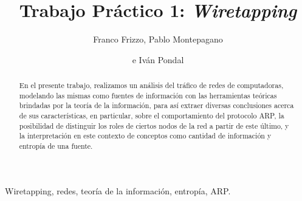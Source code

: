 \documentclass[%
    final,
    notitlepage,
    narroweqnarray,
    inline,
    twoside,
]{ieee}
\begin{document}
\title[Trabajo Práctico 1: Wiretapping]{%
       Trabajo Práctico 1: \emph{Wiretapping}}

\author[FRIZZO, MONTEPAGANO, PONDAL]{Franco Frizzo, Pablo Montepagano
\and{}e Iván Pondal}


\maketitle

\begin{abstract}
En el presente trabajo, realizamos un análisis del tráfico de redes de
computadoras, modelando las mismas como fuentes de información con las
herramientas teóricas brindadas por la teoría de la información, para así
extraer diversas conclusiones acerca de sus características, en particular,
sobre el comportamiento del protocolo ARP, la posibilidad de distinguir los
roles de ciertos nodos de la red a partir de este último, y la interpretación
en este contexto de conceptos como cantidad de información y entropía de una
fuente.

\end{abstract}

\begin{keywords}
Wiretapping, redes, teoría de la información, entropía, ARP.
\end{keywords}








\end{document}
